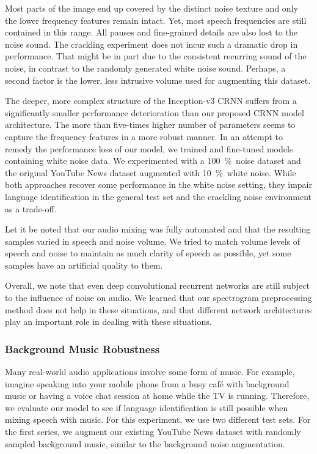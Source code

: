 %
Most parts of the image end up covered by the distinct noise texture and only the lower frequency features remain intact. Yet, most speech frequencies are still contained in this range. All pauses and fine-grained details are also lost to the noise sound. The crackling experiment does not incur such a dramatic drop in performance. That might be in part due to the consistent recurring sound of the noise, in contrast to the randomly generated white noise sound. Perhaps, a second factor is the lower, less intrusive volume used for augmenting this dataset.

The deeper, more complex structure of the Inception-v3 CRNN suffers from a significantly smaller performance deterioration than our proposed CRNN model architecture. The more than five-times higher number of parameters seems to capture the frequency features in a more robust manner. In an attempt to remedy the performance loss of our model, we trained and fine-tuned models containing white noise data. We experimented with a \SI{100}{\percent}~noise dataset and the original YouTube News dataset augmented with \SI{10}{\percent}~white noise. While both approaches recover some performance in the white noise setting, they impair language identification in the general test set and the crackling noise environment as a trade-off.

Let it be noted that our audio mixing was fully automated and that the resulting samples varied in speech and noise volume. We tried to match volume levels of speech and noise to maintain as much clarity of speech as possible, yet some samples have an artificial quality to them.



Overall, we note that even deep convolutional recurrent networks are still subject to the influence of noise on audio. We learned that our spectrogram preprocessing method does not help in these situations, and that different network architectures play an important role in dealing with these situations.



\subsubsection{Background Music Robustness}
\label{sec:music_robustness}

Many real-world audio applications involve some form of music. For example, imagine speaking into your mobile phone from a busy caf\'{e} with background music or having a voice chat session at home while the TV is running. Therefore, we evaluate our model to see if language identification is still possible when mixing speech with music. For this experiment, we use two different test sets. For the first series, we augment our existing YouTube News dataset with randomly sampled background music, similar to the background noise augmentation.

